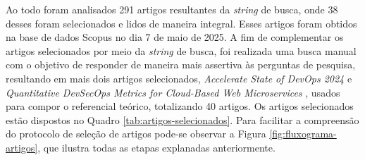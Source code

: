 Ao todo foram analisados 291 artigos resultantes da \textit{string} de busca, onde 38 desses foram selecionados e lidos de maneira integral. Esses artigos foram obtidos na base de dados Scopus no dia 7 de maio de 2025. A fim de complementar os artigos selecionados por meio da \textit{string} de busca, foi realizada uma busca manual com o objetivo de responder de maneira mais assertiva às perguntas de pesquisa, resultando em mais dois artigos selecionados, \textit{Accelerate State of DevOps 2024} \cite{DORA2024} e \textit{Quantitative DevSecOps Metrics for Cloud-Based Web Microservices} \cite{Zhang2024160317}, usados para compor o referencial teórico, totalizando 40 artigos.
Os artigos selecionados estão dispostos no Quadro \ref{tab:artigos-selecionados}. Para facilitar a compreensão do protocolo de seleção de artigos pode-se observar a Figura \ref{fig:fluxograma-artigos}, que ilustra todas as etapas explanadas anteriormente.

